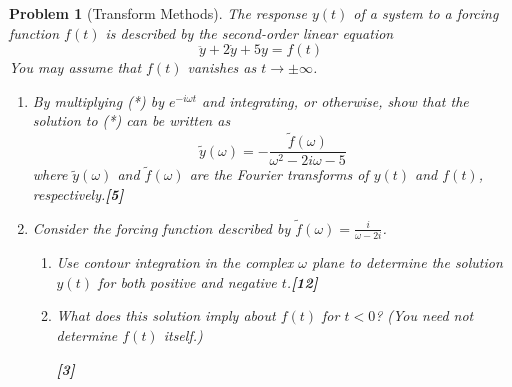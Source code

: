 \documentclass[a4paper]{article}
\theoremstyle{new}
\newtheorem{qns}{Problem}[section]
\begin{document}
\begin{qns}[Transform Methods]
The response $y(t)$ of a system to a forcing function $f(t)$ is described by the second-order linear equation
\begin{equation}
    \ddot{y}+2\dot{y}+5y=f(t)\tag{*}
\end{equation}
You may assume that $f(t)$ vanishes as $t\rightarrow\pm\infty$.
\begin{enumerate}[label=(\alph*)]
\item By multiplying (*) by $e^{-i\omega t}$ and integrating, or otherwise, show that the solution to (*) can be written as
$$\tilde{y}(\omega)=-\frac{\tilde{f}(\omega)}{\omega^2-2i\omega -5}$$
where $\tilde{y}(\omega)$ and $\tilde{f}(\omega)$ are the Fourier transforms of $y(t)$ and $f(t)$, respectively.\hfill\textbf{[5]}
\item Consider the forcing function described by $\tilde{f}(\omega)=\frac{i}{\omega-2i}$.
\begin{enumerate}[label=(\roman*)]
\item Use contour integration in the complex $\omega$ plane to determine the solution $y(t)$ for both positive and negative $t$.\hfill\textbf{[12]}
\item What does this solution imply about $f(t)$ for $t < 0$? (You need not determine $f(t)$ itself.)

\hfill\textbf{[3]}
\end{enumerate}
\end{enumerate}
\end{qns}
\end{document}

